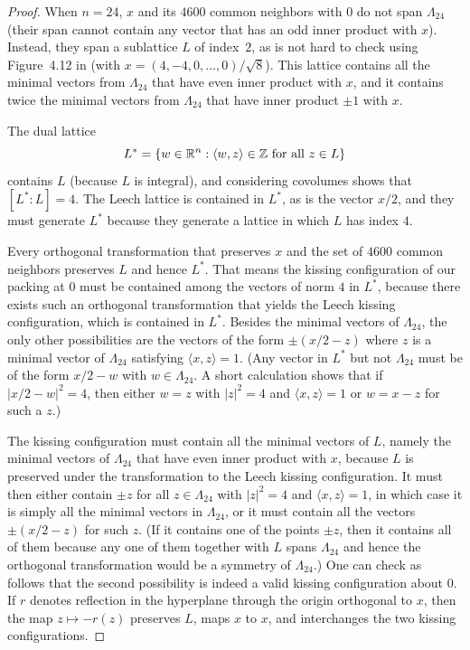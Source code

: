 \documentclass{jams-l}
\theoremstyle{plain}
\numberwithin{theorem}{section}
\theoremstyle{definition}
\numberwithin{equation}{section}
\newcommand{\R}{{\mathbb R}}
\newcommand{\Z}{{\mathbb Z}}
\begin{document}
\begin{proof}
When $n=24$, $x$ and its $4600$ common neighbors with $0$ do not
span $\Lambda_{24}$ (their span cannot contain any vector that has
an odd inner product with $x$).  Instead, they span a sublattice
$L$ of index~$2$, as is not hard to check using Figure~4.12 in
\cite[p.~133]{CS} (with $x = (4,-4,0,\dots,0)/\sqrt{8}$). This
lattice contains all the minimal vectors from $\Lambda_{24}$ that
have even inner product with $x$, and it contains twice the
minimal vectors from $\Lambda_{24}$ that have inner product $\pm
1$ with $x$.

The dual lattice
$$
L^* = \{ w \in \R^n : \langle w,z \rangle \in \Z \textup{ for all
$z \in L$} \}
$$
contains $L$ (because $L$ is integral), and considering
covolumes shows that $[L^* : L] = 4$.  The Leech lattice is
contained in $L^*$, as is the vector $x/2$, and they must generate
$L^*$ because they generate a lattice in which $L$ has index $4$.

Every orthogonal transformation that preserves $x$ and the set of
$4600$ common neighbors preserves $L$ and hence $L^*$.  That means
the kissing configuration of our packing at $0$ must be contained
among the vectors of norm $4$ in $L^*$, because there exists such
an orthogonal transformation that yields the Leech kissing
configuration, which is contained in $L^*$. Besides the minimal
vectors of $\Lambda_{24}$, the only other possibilities are the
vectors of the form $\pm(x/2 - z)$ where $z$ is a minimal vector
of $\Lambda_{24}$ satisfying $\langle x,z \rangle = 1$. (Any
vector in $L^*$ but not $\Lambda_{24}$ must be of the form $x/2-w$
with $w \in \Lambda_{24}$.  A short calculation shows that if
$|x/2-w|^2=4$, then either $w=z$ with $|z|^2=4$ and $\langle x,z
\rangle =1$ or $w=x-z$ for such a $z$.)

The kissing configuration must contain all the minimal vectors of
$L$, namely the minimal vectors of $\Lambda_{24}$ that have even
inner product with $x$, because $L$ is preserved under the
transformation to the Leech kissing configuration. It must then
either contain $\pm z$ for all $z \in \Lambda_{24}$ with $|z|^2=4$
and $\langle x,z \rangle = 1$, in which case it is simply all the
minimal vectors in $\Lambda_{24}$, or it must contain all the
vectors $\pm(x/2 - z)$ for such $z$. (If it contains one of the
points $\pm z$, then it contains all of them because any one of
them together with $L$ spans $\Lambda_{24}$ and hence the
orthogonal transformation would be a symmetry of $\Lambda_{24}$.)
One can check as follows that the second possibility is indeed a
valid kissing configuration about $0$. If $r$ denotes reflection
in the hyperplane through the origin orthogonal to $x$, then the
map $z \mapsto -r(z)$ preserves $L$, maps $x$ to $x$, and
interchanges the two kissing configurations.


\end{proof}
\end{document}
